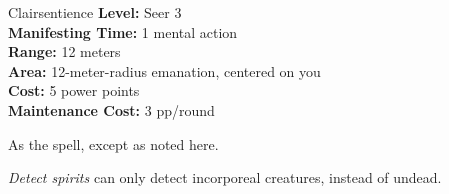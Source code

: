 {Clairsentience}
{
	\textbf{Level:}
	Seer 3\\
	\textbf{Manifesting Time:}
	1 mental action\\
	\textbf{Range:}
	12 meters\\
	\textbf{Area:}
	12-meter-radius emanation, centered on you\\
	\textbf{Cost:}
	5 power points\\
	\textbf{Maintenance Cost:}
	3 pp/round\\
}
{
	As the  spell, except as noted here.

	\emph{Detect spirits} can only detect incorporeal creatures, instead of undead.
}